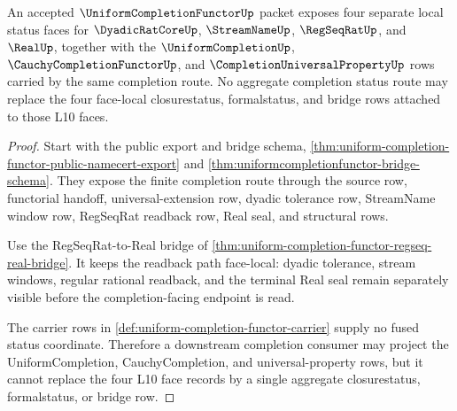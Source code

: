 \begin{theorem}
\label{thm:uniform-completion-functor-l10-status-product-noncollapse}
An accepted $\UniformCompletionFunctorUp$ packet exposes four separate local status faces for $\DyadicRatCoreUp$, $\StreamNameUp$, $\RegSeqRatUp$, and $\RealUp$, together with the $\UniformCompletionUp$, $\CauchyCompletionFunctorUp$, and $\CompletionUniversalPropertyUp$ rows carried by the same completion route. No aggregate completion status route may replace the four face-local closurestatus, formalstatus, and bridge rows attached to those L10 faces.
\end{theorem}
\begin{proof}
Start with the public export and bridge schema, \autoref{thm:uniform-completion-functor-public-namecert-export} and \autoref{thm:uniformcompletionfunctor-bridge-schema}. They expose the finite completion route through the source row, functorial handoff, universal-extension row, dyadic tolerance row, StreamName window row, RegSeqRat readback row, Real seal, and structural rows.

Use the RegSeqRat-to-Real bridge of \autoref{thm:uniform-completion-functor-regseq-real-bridge}. It keeps the readback path face-local: dyadic tolerance, stream windows, regular rational readback, and the terminal Real seal remain separately visible before the completion-facing endpoint is read.

The carrier rows in \autoref{def:uniform-completion-functor-carrier} supply no fused status coordinate. Therefore a downstream completion consumer may project the UniformCompletion, CauchyCompletion, and universal-property rows, but it cannot replace the four L10 face records by a single aggregate closurestatus, formalstatus, or bridge row.
\end{proof}



